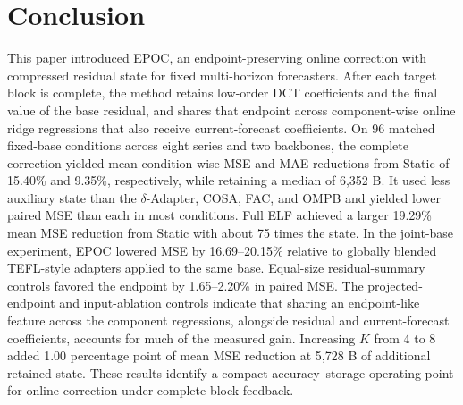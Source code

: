 \section{Conclusion}
\label{sec:conclusion}

This paper introduced EPOC, an endpoint-preserving online correction with compressed residual state for fixed multi-horizon forecasters. After each target block is complete, the method retains low-order DCT coefficients and the final value of the base residual, and shares that endpoint across component-wise online ridge regressions that also receive current-forecast coefficients. On 96 matched fixed-base conditions across eight series and two backbones, the complete correction yielded mean condition-wise MSE and MAE reductions from Static of 15.40\% and 9.35\%, respectively, while retaining a median of 6,352 B. It used less auxiliary state than the $\delta$-Adapter, COSA, FAC, and OMPB and yielded lower paired MSE than each in most conditions. Full ELF achieved a larger 19.29\% mean MSE reduction from Static with about 75 times the state. In the joint-base experiment, EPOC lowered MSE by 16.69--20.15\% relative to globally blended TEFL-style adapters applied to the same base. Equal-size residual-summary controls favored the endpoint by 1.65--2.20\% in paired MSE. The projected-endpoint and input-ablation controls indicate that sharing an endpoint-like feature across the component regressions, alongside residual and current-forecast coefficients, accounts for much of the measured gain. Increasing $K$ from 4 to 8 added 1.00 percentage point of mean MSE reduction at 5,728 B of additional retained state. These results identify a compact accuracy--storage operating point for online correction under complete-block feedback.

